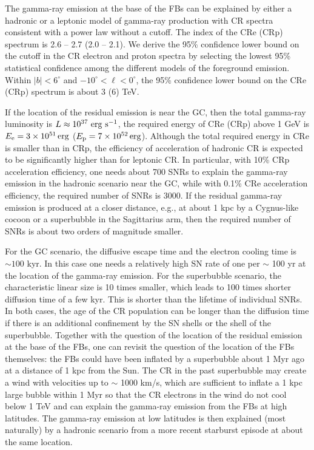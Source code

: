 The gamma-ray emission at the base of the FBs can be explained by either a hadronic or a leptonic model of gamma-ray production
with CR spectra consistent with a power law without a cutoff.
The index of the CRe (CRp) spectrum is 2.6 -- 2.7 (2.0 -- 2.1).
We derive the 95\% confidence lower bound on the cutoff in the CR electron and proton spectra
by selecting the lowest 95\% statistical confidence among the different models of the foreground emission.
Within $|b| < 6^\circ$ and $-10^\circ < \ell < 0^\circ$, the 95\% confidence lower bound on the CRe (CRp) spectrum is
about 3 (6) TeV.

If the location of the residual emission is near the GC,
then the total gamma-ray luminosity is $L \approx 10^{37}\ {\rm erg\ s^{-1}}$,
the required energy of CRe (CRp) above 1 GeV is $E_{\rm e} = \SI{3e51}{erg}$
($E_{\rm p} = \SI{7e52}{erg}$).
Although the total required energy in CRe is smaller than in CRp,
the efficiency of acceleration of hadronic CR is expected to be significantly higher than for leptonic CR.
In particular, with 10\% CRp acceleration efficiency, one needs about 700 SNRs to explain the 
gamma-ray emission in the hadronic scenario near the GC,
while with 0.1\% CRe acceleration efficiency, the required number of SNRs is 3000.
If the residual gamma-ray emission is produced at a closer distance, e.g., at about 1 kpc
by a Cygnus-like cocoon or a superbubble in the Sagittarius arm, 
then the required number of SNRs is about two orders of magnitude smaller.

For the GC scenario, the diffusive escape time and the electron cooling time is $\sim 100$ kyr.
In this case one needs a relatively high SN rate of one per $\sim$ 100 yr at the location of the gamma-ray emission.
For the superbubble scenario, the characteristic linear size is 10 times smaller, which leads to 100 times shorter
diffusion time of a few kyr. This is shorter than the lifetime of individual SNRs.
In both cases, the age of the CR population can be longer than the diffusion time if there is an
additional confinement by the SN shells or the shell of the superbubble.
Together with the question of the location of the residual emission at the base of the FBs,
one can revisit the question of the location of the FBs themselves:
the FBs could have been inflated by a superbubble about 1 Myr ago
at a distance of 1 kpc from the Sun.
The CR in the past superbubble may create a wind with velocities up to $\sim$ 1000 km/s, 
which are sufficient to inflate a 1 kpc large bubble within 1 Myr
so that the CR electrons in the wind do not cool below 1 TeV and can explain the
gamma-ray emission from the FBs at high latitudes.
The gamma-ray emission at low latitudes is then explained (most naturally) by a hadronic
scenario from a more recent starburst episode at about the same location.

